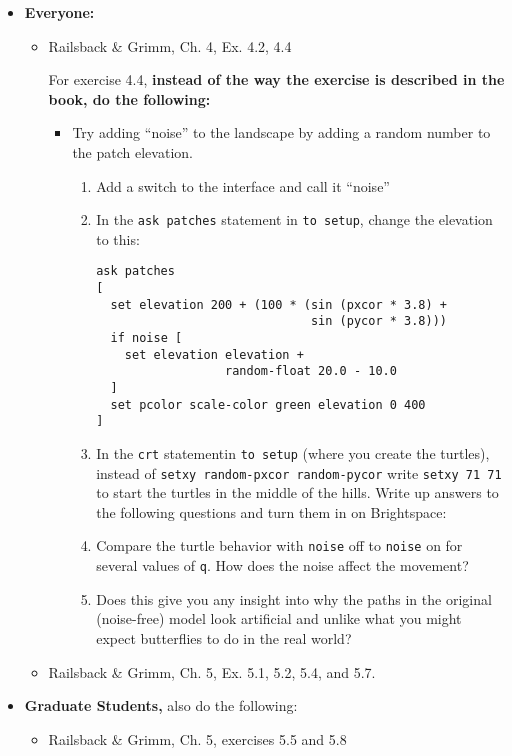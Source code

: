 \documentclass[
]{article}
\providecommand{\tightlist}{%
  \setlength{\itemsep}{0pt}\setlength{\parskip}{0pt}}
\begin{document}
\begin{itemize}
\item
  \textbf{Everyone:}

  \begin{itemize}
  \item
    Railsback \& Grimm, Ch. 4, Ex. 4.2, 4.4

    For exercise 4.4, \textbf{instead of the way the exercise is
    described in the book, do the following:}

    \begin{itemize}
    \tightlist
    \item
      Try adding ``noise'' to the landscape by adding a random number to
      the patch elevation.

      \begin{enumerate}
      \def\labelenumi{\arabic{enumi}.}
      \item
        Add a switch to the interface and call it ``noise''
      \item
        In the \texttt{ask\ patches} statement in \texttt{to\ setup},
        change the elevation to this:

\begin{verbatim}
ask patches
[
  set elevation 200 + (100 * (sin (pxcor * 3.8) +
                              sin (pycor * 3.8)))
  if noise [
    set elevation elevation +
                  random-float 20.0 - 10.0
  ]
  set pcolor scale-color green elevation 0 400
]
\end{verbatim}
      \item
        In the \texttt{crt} statementin \texttt{to\ setup} (where you
        create the turtles), instead of
        \texttt{setxy\ random-pxcor\ random-pycor} write
        \texttt{setxy\ 71\ 71} to start the turtles in the middle of the
        hills. Write up answers to the following questions and turn them
        in on Brightspace:
      \item
        Compare the turtle behavior with \texttt{noise} off to
        \texttt{noise} on for several values of \texttt{q}. How does the
        noise affect the movement?
      \item
        Does this give you any insight into why the paths in the
        original (noise-free) model look artificial and unlike what you
        might expect butterflies to do in the real world?
      \end{enumerate}
    \end{itemize}
  \item
    Railsback \& Grimm, Ch. 5, Ex. 5.1, 5.2, 5.4, and 5.7.
  \end{itemize}
\item
  \textbf{Graduate Students,} also do the following:

  \begin{itemize}
  \tightlist
  \item
    Railsback \& Grimm, Ch. 5, exercises 5.5 and 5.8
  \end{itemize}
\end{itemize}
\end{document}
